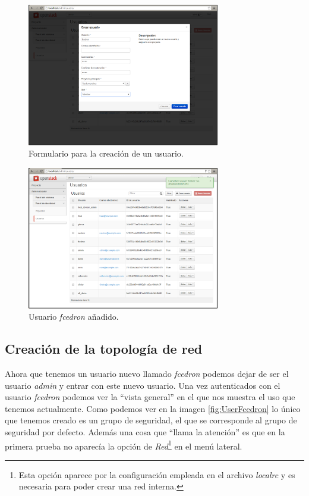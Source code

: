 \documentclass{article}
\begin{document}
\begin{figure}[h]
  \centering
    \includegraphics[width=0.75\textwidth]{img/m_007.png}
  \caption{Formulario para la creación de un usuario.}
  \label{fig:AdminFormCreateUser}
\end{figure}

\begin{figure}[h]
  \centering
    \includegraphics[width=0.75\textwidth]{img/m_008.png}
  \caption{Usuario \emph{fcedron} añadido.}
  \label{fig:AdminUserCreated}
\end{figure}

\clearpage
\subsection{Creación de la topología de red}
	Ahora que tenemos un usuario nuevo llamado \emph{fcedron} podemos dejar de ser el usuario \emph{admin} y entrar con este nuevo usuario. Una vez autenticados con el usuario \emph{fcedron} podemos ver la ``vista general'' en el que nos muestra el uso que tenemos actualmente. Como podemos ver en la imagen \ref{fig:UserFcedron} lo único que tenemos creado es un grupo de seguridad, el que se corresponde al grupo de seguridad por defecto. Además una cosa que ``llama la atención'' es que en la primera prueba no aparecía la opción de \emph{Red}\footnote{
Esta opción aparece por la configuración empleada en el archivo \emph{localrc} y es necesaria para poder crear una red interna\cite{DevstackLocalrc, NeutronDevstack, DevstackLocalrcGithub, NeutronGithubDevstack}.}
	 en el menú lateral.
	
\end{document}
